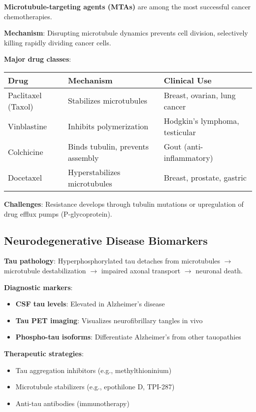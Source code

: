 \textbf{Microtubule-targeting agents (MTAs)} are among the most successful cancer chemotherapies.

\textbf{Mechanism}: Disrupting microtubule dynamics prevents cell division, selectively killing rapidly dividing cancer cells.

\textbf{Major drug classes}:

\begin{center}
\begin{tabular}{@{}lll@{}}
\toprule
\textbf{Drug} & \textbf{Mechanism} & \textbf{Clinical Use} \\
\midrule
Paclitaxel (Taxol) & Stabilizes microtubules & Breast, ovarian, lung cancer \\
Vinblastine & Inhibits polymerization & Hodgkin's lymphoma, testicular \\
Colchicine & Binds tubulin, prevents assembly & Gout (anti-inflammatory) \\
Docetaxel & Hyperstabilizes microtubules & Breast, prostate, gastric \\
\bottomrule
\end{tabular}
\end{center}

\textbf{Challenges}: Resistance develops through tubulin mutations or upregulation of drug efflux pumps (P-glycoprotein).

\subsection{Neurodegenerative Disease Biomarkers}
\label{subsec:neurodegen-biomarkers}

\textbf{Tau pathology}: Hyperphosphorylated tau detaches from microtubules $\rightarrow$ microtubule destabilization $\rightarrow$ impaired axonal transport $\rightarrow$ neuronal death.

\textbf{Diagnostic markers}:
\begin{itemize}
\item \textbf{CSF tau levels}: Elevated in Alzheimer's disease
\item \textbf{Tau PET imaging}: Visualizes neurofibrillary tangles in vivo
\item \textbf{Phospho-tau isoforms}: Differentiate Alzheimer's from other tauopathies
\end{itemize}

\textbf{Therapeutic strategies}:
\begin{itemize}
\item Tau aggregation inhibitors (e.g., methylthioninium)
\item Microtubule stabilizers (e.g., epothilone D, TPI-287)
\item Anti-tau antibodies (immunotherapy)
\end{itemize}


